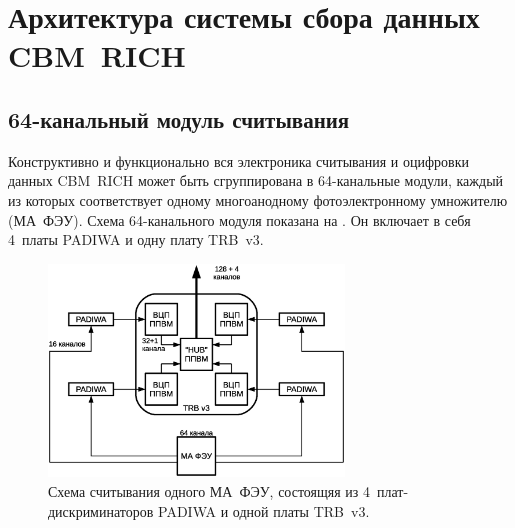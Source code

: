 \section{Архитектура системы сбора данных CBM~RICH}\label{sec:secReadout}

\subsection{64-канальный модуль считывания}\label{sec:secModule}

Конструктивно и функционально вся электроника считывания и оцифровки данных CBM~RICH может быть сгруппирована в 64-канальные модули, каждый из которых соответствует одному многоанодному фотоэлектронному умножителю (МА~ФЭУ). Схема 64-канального модуля показана на . Он включает в себя 4~платы PADIWA и одну плату TRB~v3.

\begin{figure}[H]
\centering
\includegraphics[width=0.7\textwidth]{pictures/4_A_PMT_readout_rus.eps}
\caption{Схема считывания одного МА~ФЭУ, состоящяя из 4~плат-дискриминаторов PADIWA и одной платы TRB~v3.}
\label{fig:ReadoutModule}
\end{figure}

